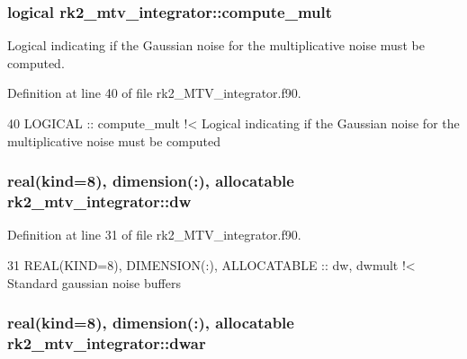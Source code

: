 \subsubsection[{\texorpdfstring{compute\+\_\+mult}{compute_mult}}]{\setlength{\rightskip}{0pt plus 5cm}logical rk2\+\_\+mtv\+\_\+integrator\+::compute\+\_\+mult\hspace{0.3cm}{\ttfamily [private]}}\hypertarget{namespacerk2__mtv__integrator_ad56fffe540caff2644799cc5510e93c9}{}\label{namespacerk2__mtv__integrator_ad56fffe540caff2644799cc5510e93c9}


Logical indicating if the Gaussian noise for the multiplicative noise must be computed. 



Definition at line 40 of file rk2\+\_\+\+M\+T\+V\+\_\+integrator.\+f90.


\begin{DoxyCode}
40   \textcolor{keywordtype}{LOGICAL} :: compute\_mult\textcolor{comment}{                                         !< Logical indicating if the Gaussian
       noise for the multiplicative noise must be computed}
\end{DoxyCode}
\subsubsection[{\texorpdfstring{dw}{dw}}]{\setlength{\rightskip}{0pt plus 5cm}real(kind=8), dimension(\+:), allocatable rk2\+\_\+mtv\+\_\+integrator\+::dw\hspace{0.3cm}{\ttfamily [private]}}\hypertarget{namespacerk2__mtv__integrator_acfc8cafd615b189ed69fe547c21a523d}{}\label{namespacerk2__mtv__integrator_acfc8cafd615b189ed69fe547c21a523d}


Definition at line 31 of file rk2\+\_\+\+M\+T\+V\+\_\+integrator.\+f90.


\begin{DoxyCode}
31   \textcolor{keywordtype}{REAL(KIND=8)}, \textcolor{keywordtype}{DIMENSION(:)}, \textcolor{keywordtype}{ALLOCATABLE} :: dw, dwmult\textcolor{comment}{           !< Standard gaussian noise buffers}
\end{DoxyCode}
\subsubsection[{\texorpdfstring{dwar}{dwar}}]{\setlength{\rightskip}{0pt plus 5cm}real(kind=8), dimension(\+:), allocatable rk2\+\_\+mtv\+\_\+integrator\+::dwar\hspace{0.3cm}{\ttfamily [private]}}\hypertarget{namespacerk2__mtv__integrator_a943f1c40aae9be23e299c05b361c7ce5}{}\label{namespacerk2__mtv__integrator_a943f1c40aae9be23e299c05b361c7ce5}


